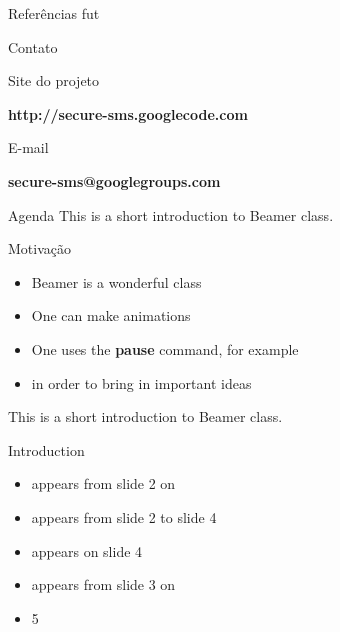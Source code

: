 \documentclass[notes,blue,mathserif]{beamer}
\begin{document}
\begin{frame}{Refer\^{e}ncias}
fut
\end{frame}

\begin{frame}{Contato}

	\begin{exampleblock}{Site do projeto}
		\begin{center}
		\begin{large}

		\textbf{http://secure-sms.googlecode.com}

		\end{large}
		\end{center}
	\end{exampleblock}

	\begin{exampleblock}{E-mail}
		\begin{center}
		\begin{large}

		\textbf{secure-sms@googlegroups.com}

		\end{large}
		\end{center}
	\end{exampleblock}

\end{frame}






\begin{frame}{Agenda}
This is a short introduction to Beamer class.
\end{frame}

\begin{frame}{Motiva\c{c}\~{a}o}
\begin{itemize}
\pause \item Beamer is a wonderful class
\pause \item One can make animations
\pause \item One uses the \textbf{pause} command, for example
\pause \item in order to bring in important ideas
\end{itemize}
This is a short introduction to Beamer class.
\end{frame}

\begin{frame}{Introduction}
\begin{itemize}
\item<2-> appears from slide 2 on
\item<2-4> appears from slide 2 to slide 4
\item<4> appears on slide 4
\item<3-> appears from slide 3 on
\item<5-> 5
\end{itemize}
\end{frame}
\end{document}
